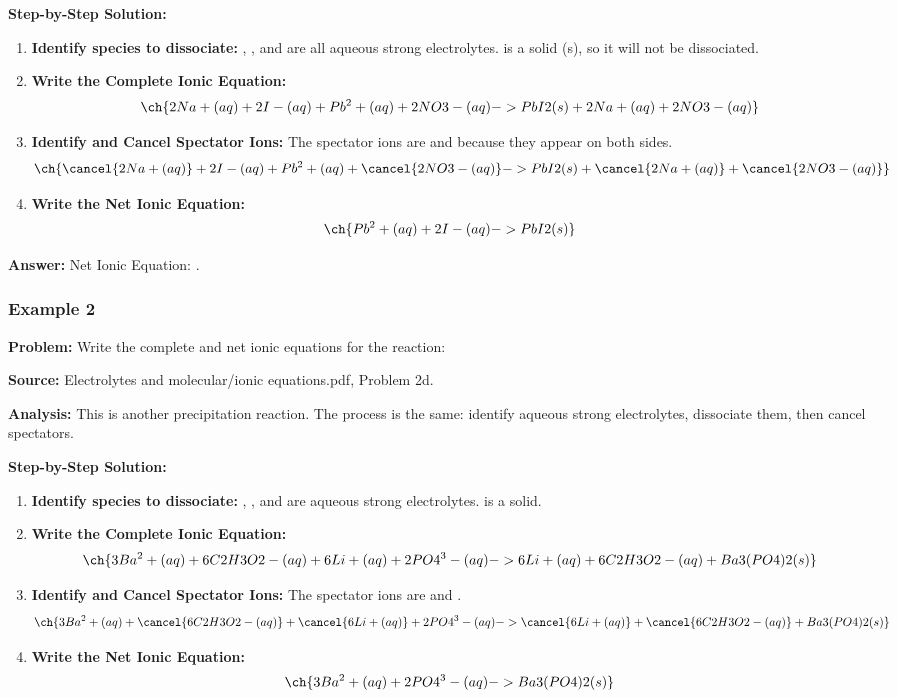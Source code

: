 \documentclass{article}
\begin{document}
\textbf{Step-by-Step Solution:}
\begin{enumerate}
    \item \textbf{Identify species to dissociate:} , , and  are all aqueous strong electrolytes.  is a solid (s), so it will not be dissociated.
    \item \textbf{Write the Complete Ionic Equation:}
    \[ \ch{2Na+(aq) + 2I-(aq) + Pb^2+(aq) + 2NO3-(aq) -> PbI2(s) + 2Na+(aq) + 2NO3-(aq)} \]
    \item \textbf{Identify and Cancel Spectator Ions:} The spectator ions are  and  because they appear on both sides.
    \[ \ch{\cancel{2Na+(aq)} + 2I-(aq) + Pb^2+(aq) + \cancel{2NO3-(aq)} -> PbI2(s) + \cancel{2Na+(aq)} + \cancel{2NO3-(aq)}} \]
    \item \textbf{Write the Net Ionic Equation:}
    \[ \ch{Pb^2+(aq) + 2I-(aq) -> PbI2(s)} \]
\end{enumerate}

\textbf{Answer:} Net Ionic Equation: \textbf{}.

\subsubsection{Example 2}
\textbf{Problem:} Write the complete and net ionic equations for the reaction: 

\textbf{Source:} Electrolytes and molecular/ionic equations.pdf, Problem 2d.

\textbf{Analysis:} This is another precipitation reaction. The process is the same: identify aqueous strong electrolytes, dissociate them, then cancel spectators.

\textbf{Step-by-Step Solution:}
\begin{enumerate}
    \item \textbf{Identify species to dissociate:} , , and  are aqueous strong electrolytes.  is a solid.
    \item \textbf{Write the Complete Ionic Equation:}
    \[ \ch{3Ba^2+(aq) + 6C2H3O2-(aq) + 6Li+(aq) + 2PO4^3-(aq) -> 6Li+(aq) + 6C2H3O2-(aq) + Ba3(PO4)2(s)} \]
    \item \textbf{Identify and Cancel Spectator Ions:} The spectator ions are  and .
    \[ \ch{3Ba^2+(aq) + \cancel{6C2H3O2-(aq)} + \cancel{6Li+(aq)} + 2PO4^3-(aq) -> \cancel{6Li+(aq)} + \cancel{6C2H3O2-(aq)} + Ba3(PO4)2(s)} \]
    \item \textbf{Write the Net Ionic Equation:}
    \[ \ch{3Ba^2+(aq) + 2PO4^3-(aq) -> Ba3(PO4)2(s)} \]
\end{enumerate}
\end{document}
